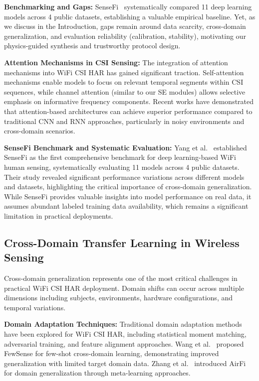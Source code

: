 \documentclass[journal]{IEEEtran}
\begin{document}
\textbf{Benchmarking and Gaps:} SenseFi~\cite{yang2023sensefi} systematically compared 11 deep learning models across 4 public datasets, establishing a valuable empirical baseline. Yet, as we discuss in the Introduction, gaps remain around data scarcity, cross-domain generalization, and evaluation reliability (calibration, stability), motivating our physics-guided synthesis and trustworthy protocol design.

\textbf{Attention Mechanisms in CSI Sensing:} The integration of attention mechanisms into WiFi CSI HAR has gained significant traction. Self-attention mechanisms enable models to focus on relevant temporal segments within CSI sequences, while channel attention (similar to our SE modules) allows selective emphasis on informative frequency components. Recent works have demonstrated that attention-based architectures can achieve superior performance compared to traditional CNN and RNN approaches, particularly in noisy environments and cross-domain scenarios.

\textbf{SenseFi Benchmark and Systematic Evaluation:} Yang et al.~\cite{yang2023sensefi} established SenseFi as the first comprehensive benchmark for deep learning-based WiFi human sensing, systematically evaluating 11 models across 4 public datasets. Their study revealed significant performance variations across different models and datasets, highlighting the critical importance of cross-domain generalization. While SenseFi provides valuable insights into model performance on real data, it assumes abundant labeled training data availability, which remains a significant limitation in practical deployments.

\subsection{Cross-Domain Transfer Learning in Wireless Sensing}

Cross-domain generalization represents one of the most critical challenges in practical WiFi CSI HAR deployment. Domain shifts can occur across multiple dimensions including subjects, environments, hardware configurations, and temporal variations.

\textbf{Domain Adaptation Techniques:} Traditional domain adaptation methods have been explored for WiFi CSI HAR, including statistical moment matching, adversarial training, and feature alignment approaches. Wang et al.~\cite{fewsense2022} proposed FewSense for few-shot cross-domain learning, demonstrating improved generalization with limited target domain data. Zhang et al.~\cite{airfi2022} introduced AirFi for domain generalization through meta-learning approaches.
\end{document}
